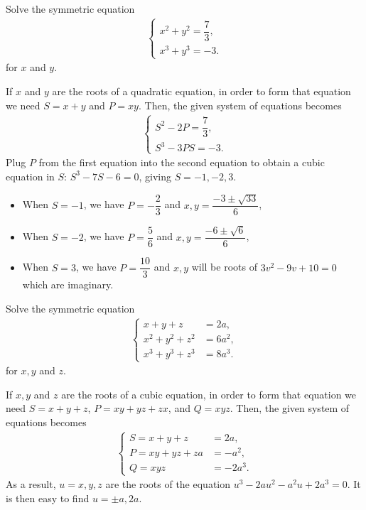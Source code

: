 \begin{question}
    Solve the symmetric equation
    \begin{align*}
            \begin{cases}
                x^2+y^2=\dfrac{7}{3},\\x^3+y^3=-3.
            \end{cases}
        \end{align*}
    for $x$ and $y$.
\end{question}

\begin{solution}
    If $x$ and $y$ are the roots of a quadratic equation, in order to form that equation we need $S=x+y$ and $P=xy$. Then, the given system of equations becomes
    \begin{align*}
        \begin{cases}
            S^2-2P=\dfrac{7}{3},\\ S^3-3PS = -3.
        \end{cases}
    \end{align*}
    Plug $P$ from the first equation into the second equation to obtain a cubic equation in $S$: $S^3-7S-6=0$, giving $S=-1,-2,3$. 
    \begin{itemize}
        \item When $S=-1$, we have $P=-\dfrac{2}{3}$ and $x,y = \dfrac{-3\pm\sqrt{33}}{6}$,
        \item When $S=-2$, we have $P=\dfrac{5}{6}$ and $x,y = \dfrac{-6\pm\sqrt{6}}{6}$,
        \item When $S=3$, we have $P=\dfrac{10}{3}$ and $x,y$ will be roots of $3v^2-9v+10=0$ which are imaginary.
    \end{itemize}
\end{solution}


\begin{question}
    Solve the symmetric equation
    \begin{align*}
            \begin{cases}
                x+y+z &= 2a,\\ x^2+y^2+z^2 &=6a^2,\\ x^3+y^3+z^3 &= 8a^3.
            \end{cases}
        \end{align*}
    for $x,y$ and $z$.
\end{question}


\begin{solution}
    If $x,y$ and $z$ are the roots of a cubic equation, in order to form that equation we need $S=x+y+z$, $P=xy+yz+zx$, and $Q=xyz$. Then, the given system of equations becomes
    \begin{align*}
        \begin{cases}
            S=x+y+z &= 2a,\\ P=xy+yz+za&=-a^2,\\ Q=xyz &= -2a^3.
        \end{cases}
    \end{align*}
    As a result, $u=x,y,z$ are the roots of the equation $u^3-2au^2-a^2u+2a^3=0$. It is then easy to find $u=\pm a, 2a$.
\end{solution}

